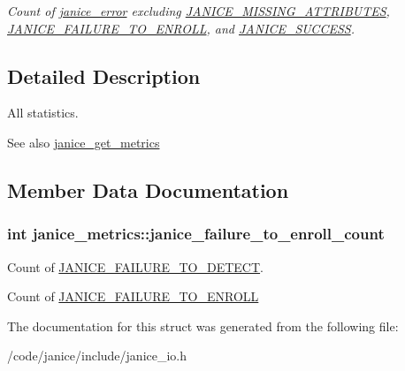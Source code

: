 \begin{DoxyCompactItemize}
\begin{DoxyCompactList}\small\item\em Count of \hyperlink{group__janice_gac9071fe2c752efef60aa3f932a290fda}{janice\+\_\+error} excluding \hyperlink{group__janice_gga4873d49c1f9d6a6880dfbd485cf6ba72a3769c1a562e8b70e94b183cfeabc2d66}{J\+A\+N\+I\+C\+E\+\_\+\+M\+I\+S\+S\+I\+N\+G\+\_\+\+A\+T\+T\+R\+I\+B\+U\+T\+E\+S}, \hyperlink{group__janice_gga4873d49c1f9d6a6880dfbd485cf6ba72ad318d25055b2f4457f326c7243f87983}{J\+A\+N\+I\+C\+E\+\_\+\+F\+A\+I\+L\+U\+R\+E\+\_\+\+T\+O\+\_\+\+E\+N\+R\+O\+L\+L}, and \hyperlink{group__janice_gga4873d49c1f9d6a6880dfbd485cf6ba72a7cd6c7d28583c2dfa4e19f8642a60f3e}{J\+A\+N\+I\+C\+E\+\_\+\+S\+U\+C\+C\+E\+S\+S}. \end{DoxyCompactList}\end{DoxyCompactItemize}


\subsection{Detailed Description}
All statistics. 

\begin{DoxySeeAlso}{See also}
\hyperlink{group__janice__io_gaa6aa5fa8550b3066a0dad696d6368762}{janice\+\_\+get\+\_\+metrics} 
\end{DoxySeeAlso}


\subsection{Member Data Documentation}
\hypertarget{structjanice__metrics_ac35a8c6f5a0e480e62a4a0c657d57ee9}{}
\subsubsection[{janice\+\_\+failure\+\_\+to\+\_\+enroll\+\_\+count}]{\setlength{\rightskip}{0pt plus 5cm}int janice\+\_\+metrics\+::janice\+\_\+failure\+\_\+to\+\_\+enroll\+\_\+count}\label{structjanice__metrics_ac35a8c6f5a0e480e62a4a0c657d57ee9}


Count of \hyperlink{group__janice_gga4873d49c1f9d6a6880dfbd485cf6ba72a4123e451be0cc17446e73331a5886749}{J\+A\+N\+I\+C\+E\+\_\+\+F\+A\+I\+L\+U\+R\+E\+\_\+\+T\+O\+\_\+\+D\+E\+T\+E\+C\+T}. 

Count of \hyperlink{group__janice_gga4873d49c1f9d6a6880dfbd485cf6ba72ad318d25055b2f4457f326c7243f87983}{J\+A\+N\+I\+C\+E\+\_\+\+F\+A\+I\+L\+U\+R\+E\+\_\+\+T\+O\+\_\+\+E\+N\+R\+O\+L\+L} 

The documentation for this struct was generated from the following file\+:\begin{DoxyCompactItemize}
\item 
/code/janice/include/janice\+\_\+io.\+h\end{DoxyCompactItemize}
